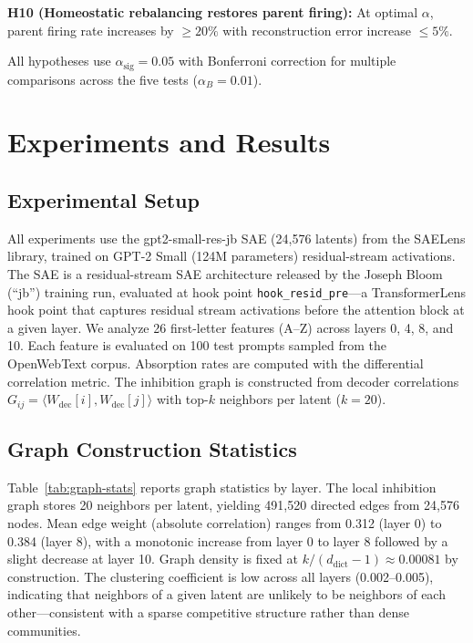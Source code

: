 \documentclass{article}
\begin{document}
\textbf{H10 (Homeostatic rebalancing restores parent firing):} At optimal $\alpha$, parent firing rate increases by $\geq 20\%$ with reconstruction error increase $\leq 5\%$.

All hypotheses use $\alpha_{\text{sig}} = 0.05$ with Bonferroni correction for multiple comparisons across the five tests ($\alpha_B = 0.01$).

\section{Experiments and Results}
\label{sec:experiments}

\subsection{Experimental Setup}
\label{sec:setup}

All experiments use the gpt2-small-res-jb SAE (24,576 latents) from the SAELens library, trained on GPT-2 Small (124M parameters) residual-stream activations. The SAE is a residual-stream SAE architecture released by the Joseph Bloom (``jb'') training run, evaluated at hook point \texttt{hook\_resid\_pre}---a TransformerLens hook point that captures residual stream activations before the attention block at a given layer. We analyze 26 first-letter features (A--Z) across layers 0, 4, 8, and 10. Each feature is evaluated on 100 test prompts sampled from the OpenWebText corpus. Absorption rates are computed with the \citet{chanin2024quantifying} differential correlation metric. The inhibition graph is constructed from decoder correlations $G_{ij} = \langle W_{\text{dec}}[i], W_{\text{dec}}[j] \rangle$ with top-$k$ neighbors per latent ($k = 20$).

\subsection{Graph Construction Statistics}
\label{sec:graph-stats}

Table~\ref{tab:graph-stats} reports graph statistics by layer. The local inhibition graph stores 20 neighbors per latent, yielding 491,520 directed edges from 24,576 nodes. Mean edge weight (absolute correlation) ranges from 0.312 (layer 0) to 0.384 (layer 8), with a monotonic increase from layer 0 to layer 8 followed by a slight decrease at layer 10. Graph density is fixed at $k / (d_{\text{dict}} - 1) \approx 0.00081$ by construction. The clustering coefficient is low across all layers (0.002--0.005), indicating that neighbors of a given latent are unlikely to be neighbors of each other---consistent with a sparse competitive structure rather than dense communities.
\end{document}
